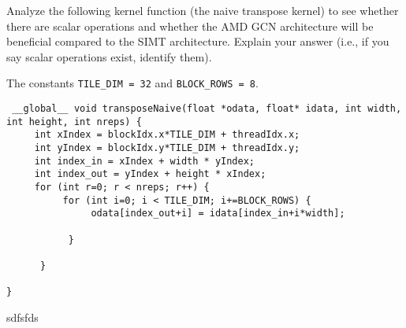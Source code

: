 \documentclass[11pt]{article}
\begin{document}
Analyze the following kernel function (the naive transpose kernel) to see whether there are scalar operations and whether the AMD GCN architecture will be beneficial compared to the SIMT architecture. Explain your answer (i.e., if you say scalar operations exist, identify them). 

The constants \verb|TILE_DIM = 32| and \verb|BLOCK_ROWS = 8|.
\begin{verbatim}
 __global__ void transposeNaive(float *odata, float* idata, int width, int height, int nreps) {
     int xIndex = blockIdx.x*TILE_DIM + threadIdx.x;
     int yIndex = blockIdx.y*TILE_DIM + threadIdx.y;
     int index_in = xIndex + width * yIndex;
     int index_out = yIndex + height * xIndex;
     for (int r=0; r < nreps; r++) {
          for (int i=0; i < TILE_DIM; i+=BLOCK_ROWS) {
               odata[index_out+i] = idata[index_in+i*width];

           }

      }

}
\end{verbatim}

\begin{Answer}
sdfsfds
\end{Answer}
\end{document}
